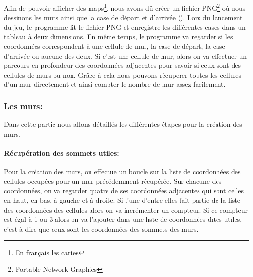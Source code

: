 \documentclass[12pt]{report}
\begin{document}
Afin de pouvoir afficher des maps\footnote{En français les cartes}, 
nous avons dû créer un fichier PNG\footnote{Portable Network Graphics} où
nous dessinons les murs ainsi que la case de départ et d'arrivée ().
Lors du lancement du jeu, le programme lit le fichier PNG et enregistre les
différentes cases dans un tableau à deux dimensions. En même temps, le programme
va regarder si les coordonnées correspondent à une cellule de mur, la case 
de départ, la case d'arrivée ou aucune des deux. Si c'est une cellule de mur, 
alors on va effectuer un parcours en profondeur des coordonnées adjacentes 
pour savoir si ceux sont des cellules de murs ou non. Grâce à cela nous 
pouvons récuperer toutes les cellules d'un mur directement et ainsi compter 
le nombre de mur assez facilement.

\subsubsection{Les murs:}

Dans cette partie nous allons détaillés les différentes étapes pour la création
des murs.

\paragraph{Récupération des sommets utiles:}

Pour la création des murs, on effectue un boucle sur la liste de coordonnées
des cellules occupées pour un mur précédemment récupérée. Sur chacune des 
coordonnées, on va regarder quatre de ses coordonnées adjacentes qui sont celles
en haut, en bas, à gauche et à droite. Si l'une d'entre elles fait partie de 
la liste des coordonnées des cellules alors on va incrémenter un compteur.
Si ce compteur est égal à 1 ou 3 alors on va l'ajouter dans une liste de coordonnées
dites utiles, c'est-à-dire que ceux sont les coordonnées des sommets des murs.
\end{document}
